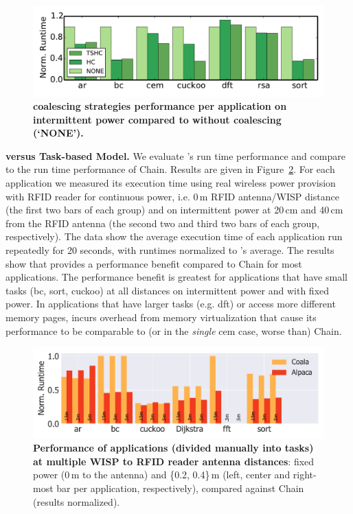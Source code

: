 \begin{figure}
	\centering
	\includegraphics[width=\columnwidth]{figures/coalStrategies}
	\caption{\textbf{\sys coalescing strategies performance per application on intermittent power compared to \sys without coalescing (`NONE').}}
	\label{fig:coalescing}
\end{figure}

\textbf{\sys versus Task-based Model.} We evaluate \sys's run time performance and compare \sys to the run time performance of Chain. Results are given in Figure~\ref{fig:runtime}. For each application we measured its execution time using real wireless power provision with RFID reader for continuous power, i.e. 0\,m RFID antenna/WISP distance (the first two bars of each group) and on intermittent power at 20\,cm and 40\,cm from the RFID antenna (the second two and third two bars of each group, respectively). The data show the average execution time of each application run repeatedly for 20 seconds, with runtimes normalized to \sys's average. The results show that \sys provides a performance benefit compared to Chain for most applications. The performance benefit is greatest for applications that have small tasks (bc, sort, cuckoo) at all distances on intermittent power and with fixed power. In applications that have larger tasks (e.g. dft) or access more different memory pages, \sys incurs overhead from memory virtualization that cause its performance to be comparable to (or in the \emph{single} cem case, worse than) Chain. 

\begin{figure}
	\centering
	\includegraphics[width=\columnwidth]{figures/coala_alpaca_gcc}
	\caption{\textbf{Performance of \sys applications (divided manually into tasks) at multiple WISP to RFID reader antenna distances}: fixed power (0\,m to the antenna) and \{0.2, 0.4\}\,m (left, center and right-most bar per application, respectively), compared against Chain (results normalized).}
	\label{fig:runtime}
\end{figure}

